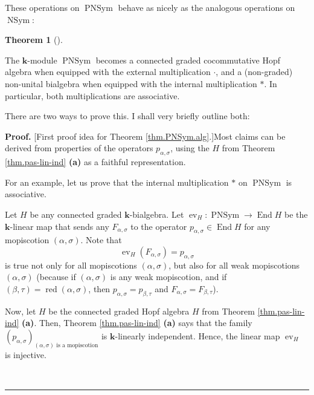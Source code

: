 \documentclass[numbers=enddot,12pt,final,onecolumn,notitlepage]{scrartcl}%
\theoremstyle{definition}
\newtheorem{theo}{Theorem}[section]
\newenvironment{theorem}[1][]
{\begin{theo}[#1]\begin{leftbar}}
{\end{leftbar}\end{theo}}
\newenvironment{proof}[1][Proof]{\noindent\textbf{#1.} }{\ \rule{0.5em}{0.5em}}
\begin{document}
These operations on $\operatorname*{PNSym}$ behave as nicely as the analogous
operations on $\operatorname*{NSym}$:

\begin{theorem}
\label{thm.PNSym.alg}The $\mathbf{k}$-module $\operatorname*{PNSym}$ becomes a
connected graded cocommutative Hopf algebra when equipped with the external
multiplication $\cdot$, and a (non-graded) non-unital bialgebra when equipped
with the internal multiplication $\ast$. In particular, both multiplications
are associative.
\end{theorem}

There are two ways to prove this. I shall very briefly outline both:

\begin{proof}
[First proof idea for Theorem \ref{thm.PNSym.alg}.]Most claims can be derived
from properties of the operators $p_{\alpha,\sigma}$, using the $H$ from
Theorem \ref{thm.pas-lin-ind} \textbf{(a)} as a faithful representation.

For an example, let us prove that the internal multiplication $\ast$ on
$\operatorname*{PNSym}$ is associative.

Let $H$ be any connected graded $\mathbf{k}$-bialgebra. Let
$\operatorname*{ev}\nolimits_{H}:\operatorname*{PNSym}\rightarrow
\operatorname*{End}H$ be the $\mathbf{k}$-linear map that sends any
$F_{\alpha,\sigma}$ to the operator $p_{\alpha,\sigma}\in\operatorname*{End}H$
for any mopiscotion $\left(  \alpha,\sigma\right)  $. Note that
\begin{equation}
\operatorname*{ev}\nolimits_{H}\left(  F_{\alpha,\sigma}\right)
=p_{\alpha,\sigma} \label{pf.thm.PNSym.alg.1st.evF=p}%
\end{equation}
is true not only for all mopiscotions $\left(  \alpha,\sigma\right)  $, but
also for all weak mopiscotions $\left(  \alpha,\sigma\right)  $ (because if
$\left(  \alpha,\sigma\right)  $ is any weak mopiscotion, and if $\left(
\beta,\tau\right)  =\operatorname*{red}\left(  \alpha,\sigma\right)  $, then
$p_{\alpha,\sigma}=p_{\beta,\tau}$ and $F_{\alpha,\sigma}=F_{\beta,\tau}$).

Now, let $H$ be the connected graded Hopf algebra $H$ from Theorem
\ref{thm.pas-lin-ind} \textbf{(a)}. Then, Theorem \ref{thm.pas-lin-ind}
\textbf{(a)} says that the family $\left(  p_{\alpha,\sigma}\right)  _{\left(
\alpha,\sigma\right)  \text{ is a mopiscotion}}$ is $\mathbf{k}$-linearly
independent. Hence, the linear map $\operatorname*{ev}\nolimits_{H}$ is injective.


\end{proof}
\end{document}
